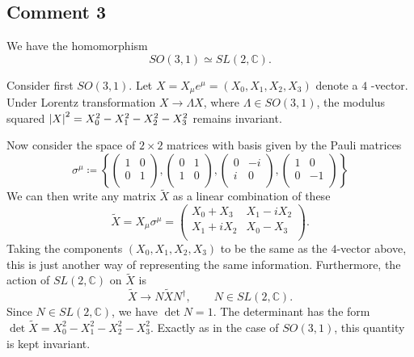 \subsection*{Comment 3}%

We have the homomorphism
\begin{equation}
  SO(3, 1) \simeq SL(2, \mathbb{C}).
\end{equation}

Consider first $SO(3, 1)$.
Let $X = X_{\mu} e^{\mu} = (X_0, X_1, X_2, X_3)$  denote a $4$ -vector.
Under Lorentz transformation $X \to \Lambda X$, where $\Lambda \in SO(3, 1)$, the modulus squared $\abs{X}^2 = X^2_0 - X^2_1 - X^2_2 - X^2_3$  remains invariant.

Now consider the space of $2 \times 2$  matrices with basis given by the Pauli matrices
\begin{equation}
  \sigma^{\mu} \coloneqq 
  \left\{ 
    \begin{pmatrix}
     1 & 0 \\
     0 & 1 \\
    \end{pmatrix},
    \begin{pmatrix}
     0 & 1 \\
     1 & 0 \\
    \end{pmatrix},
    \begin{pmatrix}
     0 & -i \\
     i & 0 \\
    \end{pmatrix},
    \begin{pmatrix}
     1 & 0 \\
     0 & -1 \\
    \end{pmatrix}
  \right\}
\end{equation}
We can then write any matrix $\widetilde{X}$ as a linear combination of these
\begin{equation}
  \label{eq:5-map}
  \widetilde{X} = X_{\mu} \sigma^{\mu} = 
  \begin{pmatrix}
   X_0 + X_3 & X_1 - i X_2 \\
   X_1 + i X_2 & X_0 - X_3 \\
  \end{pmatrix}.
\end{equation}
Taking the components $(X_0, X_1, X_2, X_3)$ to be the same as the $4$-vector above, this is just another way of representing the same information.
Furthermore, the action of $SL(2, \mathbb{C})$ on $\widetilde{X}$ is
\begin{equation}
  \widetilde{X} \to N \widetilde{X} N^{\dagger}, \qquad N \in SL(2, \mathbb{C}).
\end{equation}
Since $N \in SL(2, \mathbb{C})$, we have $\det N = 1$.  The determinant has the form $\det \widetilde{X} = X^2_0 - X^2_1 - X^2_2 - X^2_3$. Exactly as in the case of $SO(3, 1)$, this quantity is kept invariant.

